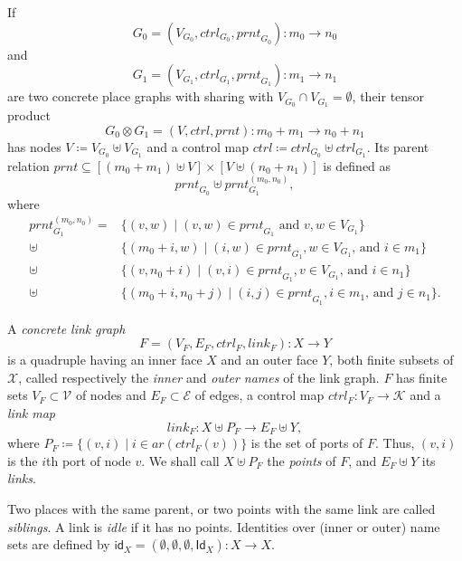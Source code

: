 \documentclass[runningheads]{llncs}
\newcommand\ctrl{\mathit{ctrl}}
\newcommand\prnt{\mathit{prnt}}
\newcommand\link{\mathit{link}}
\newcommand\ar{\mathit{ar}}
\newcommand\id{\mathsf{id}}
\newcommand\Id{\mathsf{Id}}
\begin{document}
\begin{definition}
  If 
  \[ G_0 = (V_{G_0}, \ctrl_{G_0}, \prnt_{G_0}) : m_0 \to n_0 \]
  and
  \[ G_1 = (V_{G_1}, \ctrl_{G_1}, \prnt_{G_1}) : m_1 \to n_1 \]
  are two concrete place 
  graphs with sharing with $V_{G_0} \cap V_{G_1} = \emptyset$, their tensor
  product
  \[ G_0 \otimes G_1 = (V, \ctrl, \prnt) : m_0 + m_1 \to n_0 + n_1 \]
  has nodes $V \coloneqq V_{G_0} \uplus V_{G_1}$ and a control map $\ctrl
  \coloneqq \ctrl_{G_0} \uplus \ctrl_{G_1}$. Its parent relation $\prnt
  \subseteq [(m_0 + m_1) \uplus V] \times [V \uplus (n_0 + n_1)]$ is defined as
  \[ \prnt_{G_0} \uplus \prnt_{G_1}^{(m_0, n_0)}, \]
  where
  \begin{align*}
    \prnt_{G_1}^{(m_0, n_0)} = &\{ (v, w) \mid (v, w) \in \prnt_{G_1} \text{ and } v, w \in V_{G_1} \} \\
    \uplus &\{ (m_0 + i, w) \mid (i, w) \in \prnt_{G_1}, w \in V_{G_1} \text{, and } i \in m_1 \} \\
    \uplus &\{ (v, n_0 + i) \mid (v, i) \in \prnt_{G_1}, v \in V_{G_1} \text{, and } i \in n_1 \} \\
    \uplus &\{ (m_0 + i, n_0 + j) \mid (i, j) \in \prnt_{G_1}, i \in m_1 \text{, and } j \in n_1 \}.
  \end{align*}
\end{definition}

\begin{definition}
  A \emph{concrete link graph}
  \[ F = (V_F, E_F, \ctrl_F, \link_F) : X \to Y \]
  is a quadruple having an inner face $X$ and an outer face $Y$, both finite
  subsets of $\mathcal{X}$, called respectively the \emph{inner} and
  \emph{outer names} of the link graph. $F$ has finite sets $V_F \subset
  \mathcal{V}$ of nodes and $E_F \subset \mathcal{E}$ of edges, a control map
  $\ctrl_F : V_F \to \mathcal{K}$ and a \emph{link map}
  \[ \link_F : X \uplus P_F \to E_F \uplus Y, \]
  where $P_F \coloneqq \{ (v, i) \mid i \in \ar(\ctrl_F(v)) \}$ is the set of
  ports of $F$. Thus, $(v, i)$ is the $i$th port of node $v$. We shall call $X
  \uplus P_F$ the \emph{points} of $F$, and $E_F \uplus Y$ its \emph{links}.
\end{definition}

Two places with the same parent, or two points with the same link are called
\emph{siblings}. A link is \emph{idle} if it has no points. Identities over
(inner or outer) name sets are defined by $\id_X = (\emptyset, \emptyset,
\emptyset, \Id_X) : X \to X$.
\end{document}
